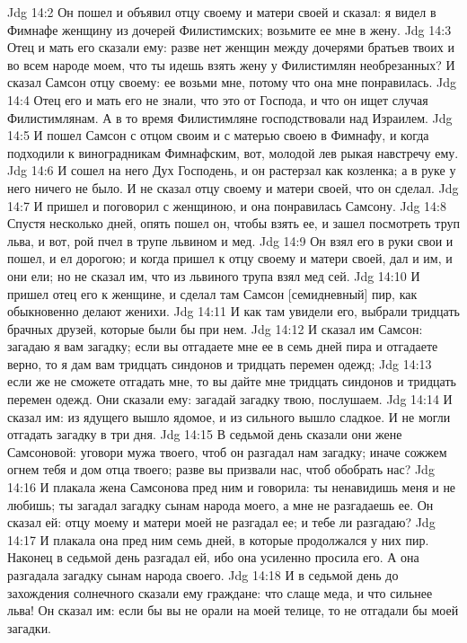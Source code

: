 \vs Jdg 14:2 Он пошел и объявил отцу своему и матери своей и сказал: я видел в Фимнафе женщину из дочерей Филистимских; возьмите ее мне в жену.
\vs Jdg 14:3 Отец и мать его сказали ему: разве нет женщин между дочерями братьев твоих и во всем народе моем, что ты идешь взять жену у Филистимлян необрезанных? И сказал Самсон отцу своему: ее возьми мне, потому что она мне понравилась.
\vs Jdg 14:4 Отец его и мать его не знали, что это от Господа, и что он ищет случая  Филистимлянам. А в то время Филистимляне господствовали над Израилем.
\vs Jdg 14:5 И пошел Самсон с отцом своим и с матерью своею в Фимнафу, и когда подходили к виноградникам Фимнафским, вот, молодой лев рыкая  навстречу ему.
\vs Jdg 14:6 И сошел на него Дух Господень, и он растерзал  как козленка; а в руке у него ничего не было. И не сказал отцу своему и матери своей, что он сделал.
\vs Jdg 14:7 И пришел и поговорил с женщиною, и она понравилась Самсону.
\vs Jdg 14:8 Спустя несколько дней, опять пошел он, чтобы взять ее, и зашел посмотреть труп льва, и вот, рой пчел в трупе львином и мед.
\vs Jdg 14:9 Он взял его в руки свои и пошел, и ел дорогою; и когда пришел к отцу своему и матери своей, дал и им, и они ели; но не сказал им, что из львиного трупа взял мед сей.
\vs Jdg 14:10 И пришел отец его к женщине, и сделал там Самсон [семидневный] пир, как обыкновенно делают женихи.
\vs Jdg 14:11 И как там увидели его, выбрали тридцать брачных друзей, которые были бы при нем.
\vs Jdg 14:12 И сказал им Самсон: загадаю я вам загадку; если вы отгадаете мне ее в семь дней пира и отгадаете верно, то я дам вам тридцать синдонов и тридцать перемен одежд;
\vs Jdg 14:13 если же не сможете отгадать мне, то вы дайте мне тридцать синдонов и тридцать перемен одежд. Они сказали ему: загадай загадку твою, послушаем.
\vs Jdg 14:14 И сказал им: из ядущего вышло ядомое, и из сильного вышло сладкое. И не могли отгадать загадку в три дня.
\vs Jdg 14:15 В седьмой день сказали они жене Самсоновой: уговори мужа твоего, чтоб он разгадал нам загадку; иначе сожжем огнем тебя и дом отца твоего; разве вы призвали нас, чтоб обобрать нас?
\vs Jdg 14:16 И плакала жена Самсонова пред ним и говорила: ты ненавидишь меня и не любишь; ты загадал загадку сынам народа моего, а мне не разгадаешь ее. Он сказал ей: отцу моему и матери моей не разгадал ее; и тебе ли разгадаю?
\vs Jdg 14:17 И плакала она пред ним семь дней, в которые продолжался у них пир. Наконец в седьмой день разгадал ей, ибо она усиленно просила его. А она разгадала загадку сынам народа своего.
\vs Jdg 14:18 И в седьмой день до захождения солнечного сказали ему граждане: что слаще меда, и что сильнее льва! Он сказал им: если бы вы не орали на моей телице, то не отгадали бы моей загадки.
